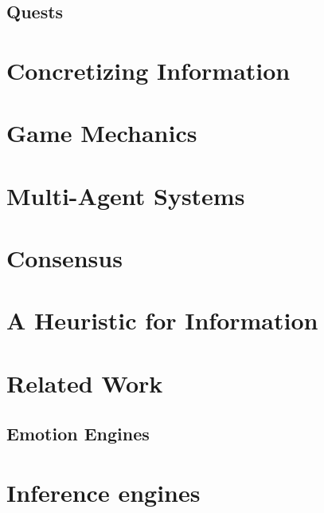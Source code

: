\subsection{Quests}
\section{Concretizing Information}
\section{Game Mechanics}
\section{Multi-Agent Systems}
\section{Consensus}
\section{A Heuristic for Information}
\section{Related Work}
\subsection{Emotion Engines}
\section{Inference engines}
